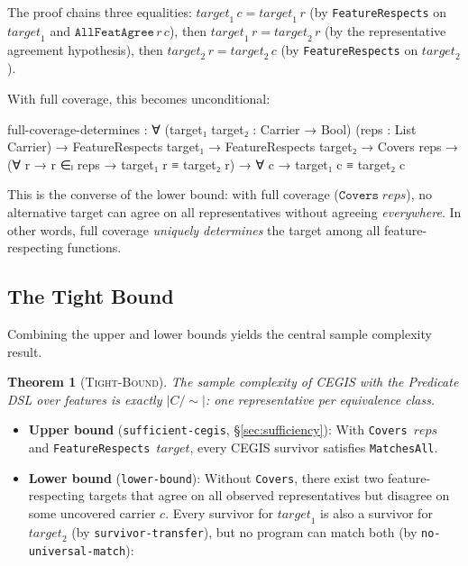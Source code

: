\documentclass[9pt,a4paper]{article}
\theoremstyle{plain}
\newtheorem{theorem}{Theorem}
\theoremstyle{definition}
\theoremstyle{remark}
\begin{document}
\noindent The proof chains three equalities: $\mathit{target}_1\, c = \mathit{target}_1\, r$ (by \texttt{FeatureRespects} on $\mathit{target}_1$ and $\texttt{AllFeatAgree}\, r\, c$), then $\mathit{target}_1\, r = \mathit{target}_2\, r$ (by the representative agreement hypothesis), then $\mathit{target}_2\, r = \mathit{target}_2\, c$ (by \texttt{FeatureRespects} on $\mathit{target}_2$).

With full coverage, this becomes unconditional:

\begin{spec}
    full-coverage-determines : ∀ (target₁ target₂ : Carrier → Bool)
      (reps : List Carrier) →
      FeatureRespects target₁ →
      FeatureRespects target₂ →
      Covers reps →
      (∀ r → r ∈ₗ reps → target₁ r ≡ target₂ r) →
      ∀ c → target₁ c ≡ target₂ c
\end{spec}

\noindent This is the converse of the lower bound: with full coverage ($\texttt{Covers}\;\mathit{reps}$), no alternative target can agree on all representatives without agreeing \emph{everywhere}.
In other words, full coverage \emph{uniquely determines} the target among all feature-respecting functions.

\subsection{The Tight Bound}
\label{sec:tight-bound}

Combining the upper and lower bounds yields the central sample complexity result.

\begin{theorem}[\textsc{Tight-Bound}]
The sample complexity of CEGIS with the Predicate DSL over features is \emph{exactly} $|C/{\sim}|$: one representative per equivalence class.
\end{theorem}

\begin{itemize}
\item \textbf{Upper bound} (\texttt{sufficient-cegis}, \S\ref{sec:sufficiency}): With \texttt{Covers}~$\mathit{reps}$ and \texttt{FeatureRespects}~$\mathit{target}$, every CEGIS survivor satisfies \texttt{MatchesAll}.
\item \textbf{Lower bound} (\texttt{lower-bound}): Without \texttt{Covers}, there exist two feature-respecting targets that agree on all observed representatives but disagree on some uncovered carrier $c$.  Every survivor for $\mathit{target}_1$ is also a survivor for $\mathit{target}_2$ (by \texttt{survivor-transfer}), but no program can match both (by \texttt{no-universal-match}):
\end{itemize}
\end{document}
